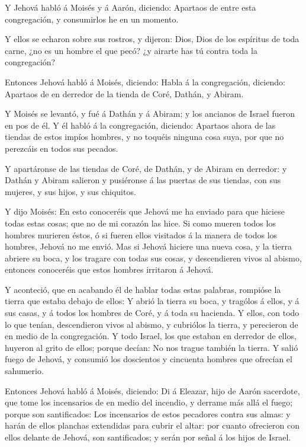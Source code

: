  Y Jehová habló á Moisés y á Aarón, diciendo: 
Apartaos de entre esta congregación, y consumirlos he en un momento.

 Y ellos se echaron sobre sus rostros, y dijeron: Dios,
Dios de los espíritus de toda carne, ¿no es un hombre el que pecó? ¿y
airarte has tú contra toda la congregación?

 Entonces Jehová habló á Moisés, diciendo: 
Habla á la congregación, diciendo: Apartaos de en derredor de la tienda
de Coré, Dathán, y Abiram.

 Y Moisés se levantó, y fué á Dathán y á Abiram; y los
ancianos de Israel fueron en pos de él.  Y él habló á la
congregación, diciendo: Apartaos ahora de las tiendas de estos impíos
hombres, y no toquéis ninguna cosa suya, por que no perezcáis en todos
sus pecados.

 Y apartáronse de las tiendas de Coré, de Dathán, y de
Abiram en derredor: y Dathán y Abiram salieron y pusiéronse á las
puertas de sus tiendas, con sus mujeres, y sus hijos, y sus chiquitos.

 Y dijo Moisés: En esto conoceréis que Jehová me ha enviado
para que hiciese todas estas cosas; que no de mi corazón las hice.
 Si como mueren todos los hombres murieren éstos, ó si
fueren ellos visitados á la manera de todos los hombres, Jehová no me
envió.  Mas si Jehová hiciere una nueva cosa, y la tierra
abriere su boca, y los tragare con todas sus cosas, y descendieren vivos
al abismo, entonces conoceréis que estos hombres irritaron á Jehová.

 Y aconteció, que en acabando él de hablar todas estas
palabras, rompióse la tierra que estaba debajo de ellos:  Y
abrió la tierra su boca, y tragólos á ellos, y á sus casas, y á todos
los hombres de Coré, y á toda su hacienda.  Y ellos, con
todo lo que tenían, descendieron vivos al abismo, y cubriólos la tierra,
y perecieron de en medio de la congregación.  Y todo
Israel, los que estaban en derredor de ellos, huyeron al grito de ellos;
porque decían: No nos trague también la tierra.  Y salió
fuego de Jehová, y consumió los doscientos y cincuenta hombres que
ofrecían el sahumerio.

 Entonces Jehová habló á Moisés, diciendo:  Di
á Eleazar, hijo de Aarón sacerdote, que tome los incensarios de en medio
del incendio, y derrame más allá el fuego; porque son santificados:
 Los incensarios de estos pecadores contra sus almas: y
harán de ellos planchas extendidas para cubrir el altar: por cuanto
ofrecieron con ellos delante de Jehová, son santificados; y serán por
señal á los hijos de Israel.

